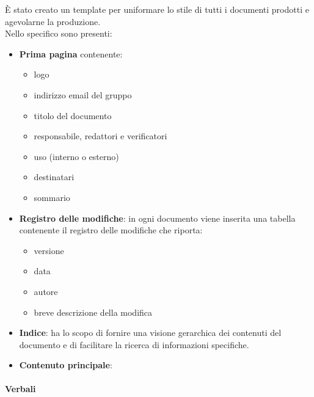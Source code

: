È stato creato un template per uniformare lo stile di tutti i documenti prodotti e agevolarne la produzione.\\
Nello specifico sono presenti:
\begin{itemize}
    \item \textbf{Prima pagina} contenente:
          \begin {itemize}
    \item logo
    \item indirizzo email del gruppo
    \item titolo del documento
    \item responsabile, redattori e verificatori
    \item uso (interno o esterno)
    \item destinatari
    \item sommario
\end{itemize}
\item \textbf{Registro delle modifiche}: in ogni documento viene inserita una tabella contenente il registro delle modifiche che riporta:
\begin{itemize}
    \item versione
    \item data
    \item autore
    \item breve descrizione della modifica
\end{itemize}
\item \textbf{Indice}: ha lo scopo di fornire una visione gerarchica dei contenuti del documento e di facilitare la ricerca di informazioni specifiche.
\item \textbf{Contenuto principale}: %
\end{itemize}

\paragraph{Verbali} ~

